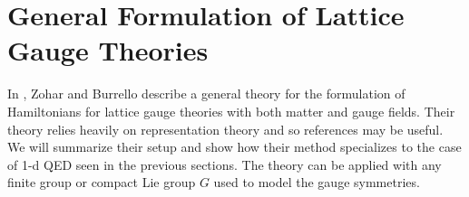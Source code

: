 \documentclass[11pt,reqno]{amsart}
\numberwithin{equation}{section}
\begin{document}
	
	
	
	\section{General Formulation of Lattice Gauge Theories}
	
	In \cite{ZoharBurrello15}, Zohar and Burrello describe a general theory for the formulation of Hamiltonians for lattice gauge theories with both matter and gauge fields. 
	Their theory relies heavily on representation theory and so references \cite{hall_lglarep,teleman_rep_theory} may be useful.
	We will summarize their setup and show how their method specializes to the case of 1-d QED seen in the previous sections.
	The theory can be applied with any finite group or compact Lie group $G$ used to model the gauge symmetries.
	
\end{document}
